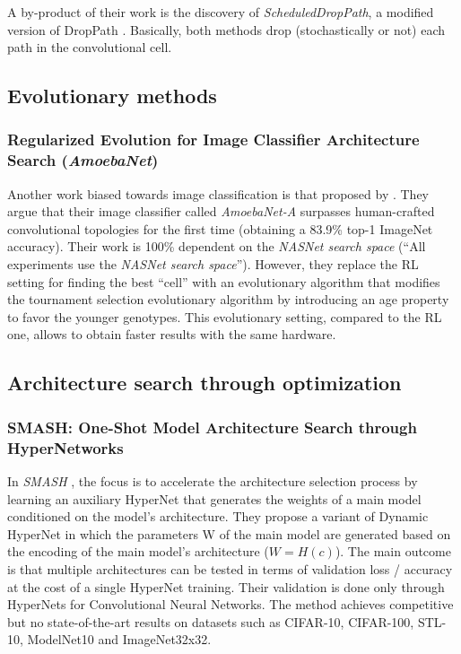 \documentclass[11pt,a4paper]{article}
\begin{document}
A by-product of their work is the discovery of \textit{ScheduledDropPath}, a modified version of DropPath \citep{larsson2017fractalnet}.  Basically, both methods drop (stochastically or not) each path in the convolutional cell.


\subsection{Evolutionary methods}

\subsubsection{Regularized Evolution for Image Classifier Architecture Search (\textit{AmoebaNet})}
\label{summary:amoebanet}

Another work biased towards image classification is that proposed by \citet{Real2018}. They argue that their image classifier called \textit{AmoebaNet-A} surpasses human-crafted convolutional topologies for the first time (obtaining a 83.9\% top-1 ImageNet accuracy). Their work is 100\% dependent on the \textit{NASNet search space} \citep{Zoph2018} (“All experiments use the \textit{NASNet search space}”). However, they replace the RL setting for finding the best “cell” with an evolutionary algorithm that modifies the tournament selection evolutionary algorithm by introducing an age property to favor the younger genotypes. This evolutionary setting, compared to the RL one, allows to obtain faster results with the same hardware.

\subsection{Architecture search through optimization}

\subsubsection{SMASH: One-Shot Model Architecture Search through HyperNetworks}
\label{summary:smash}

In \textit{SMASH} \citep{brock2017smash}, the focus is to accelerate the architecture selection process by learning an auxiliary HyperNet \citep{Ha2017} that generates the weights of a main model conditioned on the model’s architecture. They propose a variant of Dynamic HyperNet in which the parameters W of the main model are generated based on the encoding of the main model’s architecture ($W=H(c)$). The main outcome is that multiple architectures can be tested in terms of validation loss / accuracy at the cost of a single HyperNet training. Their validation is done only through HyperNets for Convolutional Neural Networks. The method achieves competitive but no state-of-the-art results on datasets such as CIFAR-10, CIFAR-100, STL-10, ModelNet10 and ImageNet32x32.
\end{document}
